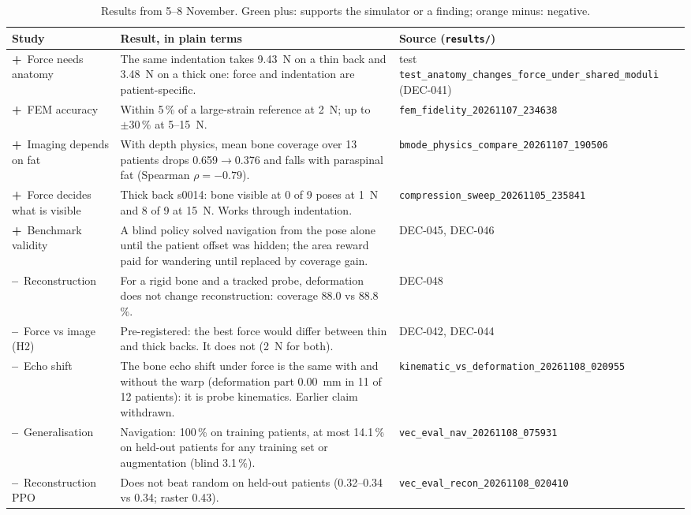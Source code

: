\documentclass[10pt,a4paper,twocolumn]{article}
\newcommand{\src}[1]{\texttt{\footnotesize #1}}
\newcommand{\dec}[1]{\textsf{#1}}
\newcommand{\pos}{\textcolor[HTML]{1baf7a}{\textbf{+}}}
\newcommand{\negr}{\textcolor[HTML]{eb6834}{\textbf{--}}}
\begin{document}
\begin{table}[t]
\centering\footnotesize
\begin{tabularx}{\linewidth}{@{}p{3.1cm}Xp{4.6cm}@{}}
\toprule
Study & Result, in plain terms & Source (\src{results/}) \\
\midrule
\pos~Force needs anatomy & The same indentation takes 9.43~N on a thin back and 3.48~N on a thick one: force
  and indentation are patient-specific. & test \src{test\_anatomy\_changes\_force\_under\_shared\_moduli} (\dec{DEC-041}) \\
\pos~FEM accuracy & Within 5\,\% of a large-strain reference at 2~N; up to $\pm 30$\,\% at 5--15~N. &
  \src{fem\_fidelity\_20261107\_234638} \\
\pos~Imaging depends on fat & With depth physics, mean bone coverage over 13 patients drops 0.659$\to$0.376 and falls
  with paraspinal fat (Spearman $\rho=-0.79$). & \src{bmode\_physics\_compare\_20261107\_190506} \\
\pos~Force decides what is visible & Thick back s0014: bone visible at 0 of 9 poses at 1~N and 8 of 9 at 15~N. Works
  through indentation. & \src{compression\_sweep\_20261105\_235841} \\
\pos~Benchmark validity & A blind policy solved navigation from the pose alone until the patient offset was hidden;
  the area reward paid for wandering until replaced by coverage gain. & \dec{DEC-045}, \dec{DEC-046} \\
\negr~Reconstruction & For a rigid bone and a tracked probe, deformation does not change reconstruction: coverage
  88.0 vs 88.8\,\%. & \dec{DEC-048} \\
\negr~Force vs image (H2) & Pre-registered: the best force would differ between thin and thick backs. It does not
  (2~N for both). & \dec{DEC-042}, \dec{DEC-044} \\
\negr~Echo shift & The bone echo shift under force is the same with and without the warp (deformation part 0.00~mm in
  11 of 12 patients): it is probe kinematics. Earlier claim withdrawn. & \src{kinematic\_vs\_deformation\_20261108\_020955} \\
\negr~Generalisation & Navigation: 100\,\% on training patients, at most 14.1\,\% on held-out patients for any training set
  or augmentation (blind 3.1\,\%). & \src{vec\_eval\_nav\_20261108\_075931} \\
\negr~Reconstruction PPO & Does not beat random on held-out patients (0.32--0.34 vs 0.34; raster 0.43). &
  \src{vec\_eval\_recon\_20261108\_020410} \\
\bottomrule
\end{tabularx}
\caption{Results from 5--8 November. Green plus: supports the simulator or a finding; orange minus: negative.}
\label{tab:earlier}
\end{table}
\end{document}
